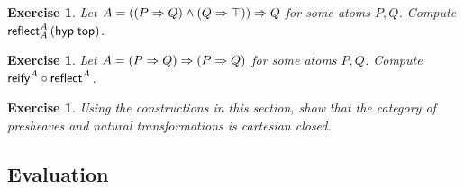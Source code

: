 \documentclass[a4paper]{article}
\newtheorem{exercise}[theorem]{Exercise}
\begin{document}
\begin{exercise}
  Let $A = ((P \imp Q) \land (Q \imp \top)) \imp Q$ for some atoms
  $P,Q$.  Compute $\reflect[A]A{(\hyp \ttop)}$.
\end{exercise}

\begin{exercise}
  Let $A = (P \imp Q) \imp (P \imp Q)$ for some atoms $P,Q$.
  Compute $\treify^A \comp \treflect^A$.
\end{exercise}

\begin{exercise}
  Using the constructions in this section, show that the category of
  presheaves and natural transformations is cartesian closed.
\end{exercise}


\subsection{Evaluation}
\end{document}

